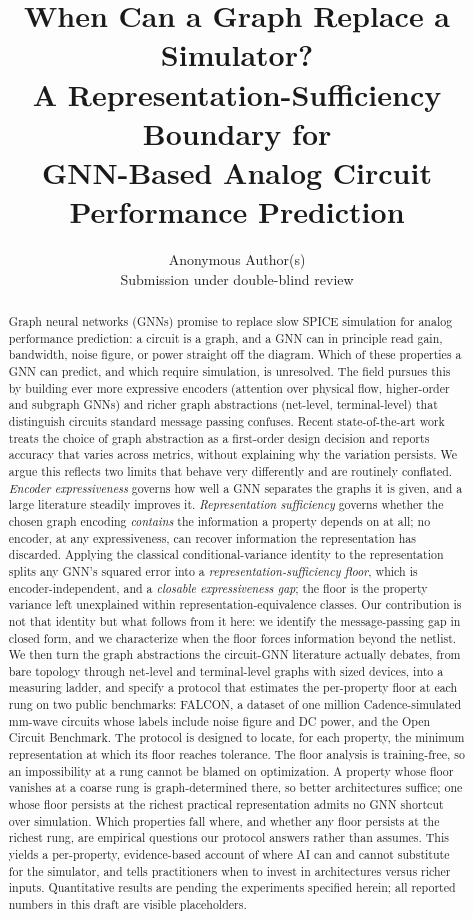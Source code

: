 \documentclass[10pt]{article}
\title{\vspace{-1.2em}\textbf{When Can a Graph Replace a Simulator?\\[2pt]
A Representation-Sufficiency Boundary for\\ GNN-Based Analog Circuit Performance Prediction}}
\author{Anonymous Author(s)\\ \small Submission under double-blind review}
\date{}
\begin{document}
\maketitle

\begin{abstract}
Graph neural networks (GNNs) promise to replace slow SPICE simulation for analog performance prediction: a circuit is a graph, and a GNN can in principle read gain, bandwidth, noise figure, or power straight off the diagram. Which of these properties a GNN can predict, and which require simulation, is unresolved. The field pursues this by building ever more expressive encoders (attention over physical flow, higher-order and subgraph GNNs) and richer graph abstractions (net-level, terminal-level) that distinguish circuits standard message passing confuses. Recent state-of-the-art work treats the choice of graph abstraction as a first-order design decision and reports accuracy that varies across metrics, without explaining why the variation persists. We argue this reflects two limits that behave very differently and are routinely conflated. \emph{Encoder expressiveness} governs how well a GNN separates the graphs it is given, and a large literature steadily improves it. \emph{Representation sufficiency} governs whether the chosen graph encoding \emph{contains} the information a property depends on at all; no encoder, at any expressiveness, can recover information the representation has discarded. Applying the classical conditional-variance identity to the representation splits any GNN's squared error into a \emph{representation-sufficiency floor}, which is encoder-independent, and a \emph{closable expressiveness gap}; the floor is the property variance left unexplained within representation-equivalence classes. Our contribution is not that identity but what follows from it here: we identify the message-passing gap in closed form, and we characterize when the floor forces information beyond the netlist. We then turn the graph abstractions the circuit-GNN literature actually debates, from bare topology through net-level and terminal-level graphs with sized devices, into a measuring ladder, and specify a protocol that estimates the per-property floor at each rung on two public benchmarks: FALCON, a dataset of one million Cadence-simulated mm-wave circuits whose labels include noise figure and DC power, and the Open Circuit Benchmark. The protocol is designed to locate, for each property, the minimum representation at which its floor reaches tolerance. The floor analysis is training-free, so an impossibility at a rung cannot be blamed on optimization. A property whose floor vanishes at a coarse rung is graph-determined there, so better architectures suffice; one whose floor persists at the richest practical representation admits no GNN shortcut over simulation. Which properties fall where, and whether any floor persists at the richest rung, are empirical questions our protocol answers rather than assumes. This yields a per-property, evidence-based account of where AI can and cannot substitute for the simulator, and tells practitioners when to invest in architectures versus richer inputs. Quantitative results are pending the experiments specified herein; all reported numbers in this draft are visible placeholders.

\end{abstract}
\end{document}
